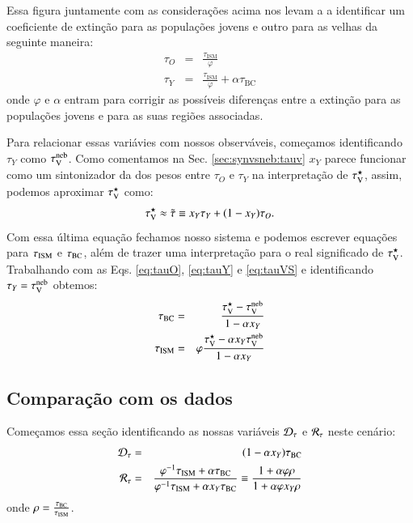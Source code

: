 Essa figura juntamente com as considerações acima nos levam a a identificar um coeficiente de
extinção para as populações jovens e outro para as velhas da seguinte maneira:
\begin{eqnarray}
	\tau_O &=& \frac{\tau_{\mathrm{ISM}}}{\varphi} \\
	\label{eq:tauO}
	\tau_Y &=& \frac{\tau_{\mathrm{ISM}}}{\varphi} + \alpha\tau_{\mathrm{BC}}
	\label{eq:tauY} 
\end{eqnarray}
\noindent onde $\varphi$ e $\alpha$ entram para corrigir as possíveis diferenças entre a extinção
para as populações jovens e para as suas regiões \Hii associadas. 

Para relacionar essas variávies com nossos observáveis, começamos identificando $\tau_Y$ como
$\tau_{\mathrm{V}}^{\mathrm{neb}}$. Como comentamos na Sec. \ref{sec:synvsneb:tauv} $x_Y$ parece funcionar como um
sintonizador da dos pesos entre $\tau_O$ e $\tau_Y$ na interpretação de $\tau_{\mathrm{V}}^\star$, assim, podemos
aproximar $\tau_{\mathrm{V}}^\star$ como:
\begin{equation}
	\tau_{\mathrm{V}}^\star \approx \tilde{\tau} \equiv x_Y \tau_Y + (1 - x_Y) \tau_O.
	\label{eq:tauVS}
\end{equation}
Com essa última equação fechamos nosso sistema e podemos escrever equações para $\tau_{\mathrm{ISM}}$ e
$\tau_{\mathrm{BC}}$, além de trazer uma interpretação para o real significado de $\tau_{\mathrm{V}}^\star$. Trabalhando com as
Eqs. \ref{eq:tauO}, \ref{eq:tauY} e \ref{eq:tauVS} e identificando $\tau_Y = \tau_{\mathrm{V}}^{\mathrm{neb}}$ obtemos:  
\begin{eqnarray}
	\tau_{\mathrm{BC}} &=& \frac{\tau_{\mathrm{V}}^\star - \tau_{\mathrm{V}}^{\mathrm{neb}}}{1 - \alpha x_Y} \\
	\label{eq:tauBC}
	\tau_{\mathrm{ISM}} &=& \varphi\frac{\tau_{\mathrm{V}}^\star - \alpha x_Y \tau_{\mathrm{V}}^{\mathrm{neb}}}{1 - \alpha x_Y}  
	\label{eq:tauISM}
\end{eqnarray}

\subsection{Comparação com os dados}
\label{sec:difextin:modelinterp:comp}

Começamos essa seção identificando as nossas variáveis $\mathcal{D}_\tau$ e $\mathcal{R}_\tau$ neste cenário:
\begin{eqnarray}
	\mathcal{D}_\tau &=& (1 - \alpha x_Y) \tau_{\mathrm{BC}} \\
	\label{eq:DtauxY}
	\mathcal{R}_\tau &=& \frac{\varphi^{-1} \tau_{\mathrm{ISM}} + \alpha \tau_{\mathrm{BC}}}{\varphi^{-1} \tau_{\mathrm{ISM}} + \alpha x_Y \tau_{\mathrm{BC}}}
\equiv \frac{1 + \alpha \varphi \rho}{1 + \alpha \varphi x_Y \rho}
	\label{eq:RtauxY}
\end{eqnarray}
\noindent onde $\rho = \frac{\tau_{\mathrm{BC}}}{\tau_{\mathrm{ISM}}}$. 



